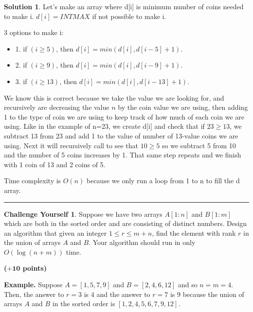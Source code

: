 \documentclass{article}
\theoremstyle{definition}
\newtheorem*{challenge}{Challenge Yourself}
\def\fline{\rule{0.75\linewidth}{0.5pt}}
\newcommand{\finishline}{\begin{center}\fline\end{center}}
\newtheorem*{solution*}{Solution}
\newenvironment{solution}{\begin{solution*}}{{\finishline} \end{solution*}}
\newcommand{\grade}[1]{\hfill{\textbf{($\mathbf{#1}$ points)}}}
\begin{document}
	\begin{solution}
		\item Let's make an array where d[i] is minimum number of coins needed to make i. $d[i] = INTMAX$ if not possible to make i.
		\item 3 options to make i:
				\begin{itemize}
				\item 1. if $(i \geq 5)$, then $d[i] = min(d[i], d[i - 5] + 1).$
				\item 2. if $(i \geq 9)$, then $d[i] = min(d[i], d[i - 9] + 1).$
				\item 3. if $(i \geq 13)$, then $d[i] = min(d[i], d[i - 13] + 1).$
				\end{itemize}
		\item We know this is correct because we take the value we are looking for, and recursively are decreasing the value $n$ by the coin value we are using, then adding 1 to the type of coin we are using to keep track of how much of each coin we are using. Like in the example of n=23, we create d[i] and check that if $23 \geq 13$, we subtract 13 from 23 and add 1 to the value of number of 13-value coins we are using. Next it will recursively call to see that $10 \geq 5$ so we subtract 5 from 10 and the number of 5 coins increases by 1. That same step repeats and we finish with 1 coin of 13 and 2 coins of 5.
		\item Time complexity is $O(n)$ because we only run a loop from 1 to n to fill the d array.
	\end{solution}
	

\smallskip



\begin{challenge}
	Suppose we have two arrays $A[1:n]$ and $B[1:m]$ which are both in the sorted order and are consisting of distinct numbers. Design an algorithm that given an integer $1 \leq r \leq m+n$, find the element with rank $r$ 
	in the union of arrays $A$ and $B$. Your algorithm should run in only $O(\log{(n+m)})$ time. 
	
	\grade{+10}
	
	\textbf{Example.} Suppose $A=[1,5,7,9]$ and $B=[2,4,6,12]$ and so $n=m=4$. Then, the answer to $r=3$ is $4$ and the answer to $r=7$ is $9$ because the union of arrays $A$ and $B$ in the sorted order is $[1,2,4,5,6,7,9,12]$. 
\end{challenge}

\smallskip
\end{document}
